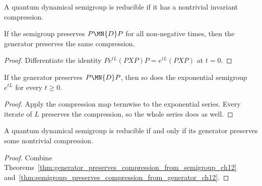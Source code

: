 \begin{definition}
    \label{def:is_reducible_qds_ch12}
    \leanok
    A quantum dynamical semigroup is reducible if it has a nontrivial invariant compression.
\end{definition}

\begin{theorem}
    \label{thm:generator_preserves_compression_from_semigroup_ch12}
    \leanok
    If the semigroup preserves $P\MN{D}P$ for all non-negative times, then the generator
    preserves the same compression.
\end{theorem}

\begin{proof}
    \leanok
    Differentiate the identity
    $Pe^{tL}(PXP)P=e^{tL}(PXP)$ at $t=0$.
\end{proof}

\begin{theorem}
    \label{thm:semigroup_preserves_compression_from_generator_ch12}
    \leanok
    If the generator preserves $P\MN{D}P$, then so does the exponential semigroup
    $e^{tL}$ for every $t\ge0$.
\end{theorem}

\begin{proof}
    \leanok
    Apply the compression map termwise to the exponential series. Every iterate of $L$
    preserves the compression, so the whole series does as well.
\end{proof}

\begin{theorem}
    \label{thm:isReducibleQDS_iff_generator_preserves_compression_ch12}
    \leanok
    A quantum dynamical semigroup is reducible if and only if its generator preserves some
    nontrivial compression.
\end{theorem}

\begin{proof}
    \leanok
    Combine Theorems~\ref{thm:generator_preserves_compression_from_semigroup_ch12}
    and~\ref{thm:semigroup_preserves_compression_from_generator_ch12}.
\end{proof}

